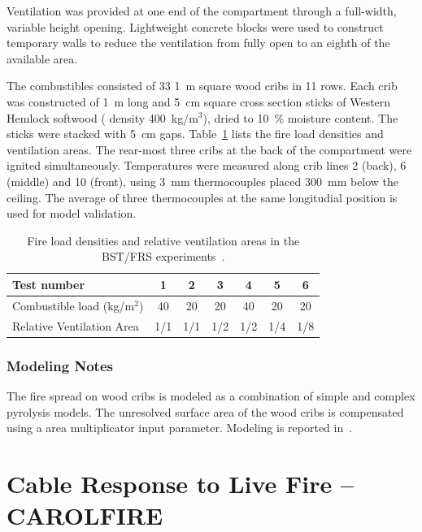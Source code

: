 Ventilation was provided at one end of the compartment through a full-width, variable height opening. Lightweight concrete blocks were used to construct temporary walls to reduce the ventilation from fully open to an eighth of the available area.

The combustibles consisted of 33 1~m square wood cribs in 11 rows. Each crib was constructed of 1~m long and 5~cm square cross section sticks of Western Hemlock softwood ( density 400~kg/m$^3$), dried to 10~\% moisture content. The sticks were stacked with 5~cm gaps. Table~\ref{BST_FRS_wood_cribs_tests} lists the fire load densities and ventilation areas. The rear-most three cribs at the back of the compartment were ignited simultaneously. Temperatures were measured along crib lines 2 (back), 6 (middle) and 10 (front), using 3~mm thermocouples placed 300~mm below the ceiling. The average of three thermocouples at the same longitudial position is used for model validation.

\begin{table}[ht]
\begin{center}
\caption[BST/FRS test cases]{Fire load densities and relative ventilation areas in the BST/FRS experiments~\cite{BST_FRS:1994}.}
\label{BST_FRS_wood_cribs_tests}
\begin{tabular}{|l|c|c|c|c|c|c|}
\hline
Test number                     & 1   & 2   & 3   & 4   & 5  & 6  \\ \hline \hline 
Combustible load (kg/m$^2$)     & 40  & 20  & 20  & 40  & 20 & 20 \\
Relative Ventilation Area       & 1/1 & 1/1 & 1/2 & 1/2 & 1/4 & 1/8 \\ \hline
\end{tabular}
\end{center}
\end{table}

\subsubsection{Modeling Notes}

The fire spread on wood cribs is modeled as a combination of simple and complex pyrolysis models. The unresolved surface area of the wood cribs is compensated using a area multiplicator input parameter. Modeling is reported in~\cite{Janardhan:FSJ2021}.


\section{Cable Response to Live Fire -- CAROLFIRE}
\label{CAROLFIRE_Description}


